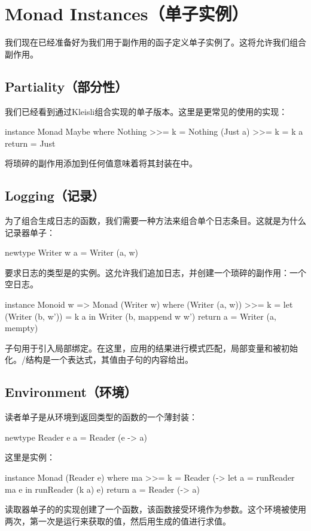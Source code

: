 \documentclass[DaoFP]{subfiles}
\begin{document}
    \section{Monad Instances（单子实例）}

    我们现在已经准备好为我们用于副作用的函子定义单子实例了。这将允许我们组合副作用。

    \subsection{Partiality（部分性）}
    我们已经看到通过Kleisli组合实现的单子版本。这里是更常见的使用的实现：
    \begin{haskell}
        instance Monad Maybe where
        Nothing >>= k = Nothing
        (Just a) >>= k = k a
        return = Just
    \end{haskell}
    将琐碎的副作用添加到任何值意味着将其封装在中。

    \subsection{Logging（记录）}
    为了组合生成日志的函数，我们需要一种方法来组合单个日志条目。这就是为什么记录器单子：
    \begin{haskell}
        newtype Writer w a = Writer (a, w)
    \end{haskell}
    要求日志的类型是的实例。这允许我们追加日志，并创建一个琐碎的副作用：一个空日志。
    \begin{haskell}
        instance Monoid w => Monad (Writer w) where
        (Writer (a, w)) >>= k = let (Writer (b, w')) = k a
        in Writer (b, mappend w w')
        return a = Writer (a, mempty)
    \end{haskell}
    子句用于引入局部绑定。在这里，应用的结果进行模式匹配，局部变量和被初始化。/结构是一个表达式，其值由子句的内容给出。

    \subsection{Environment（环境）}

    读者单子是从环境到返回类型的函数的一个薄封装：
    \begin{haskell}
        newtype Reader e a = Reader (e -> a)
    \end{haskell}
    这里是实例：
    \begin{haskell}
        instance Monad (Reader e) where
        ma >>= k = Reader (\e -> let a = runReader ma e
        in runReader (k a) e)
        return a = Reader (\e -> a)
    \end{haskell}
    读取器单子的的实现创建了一个函数，该函数接受环境作为参数。这个环境被使用两次，第一次是运行来获取的值，然后用生成的值进行求值。
\end{document}
